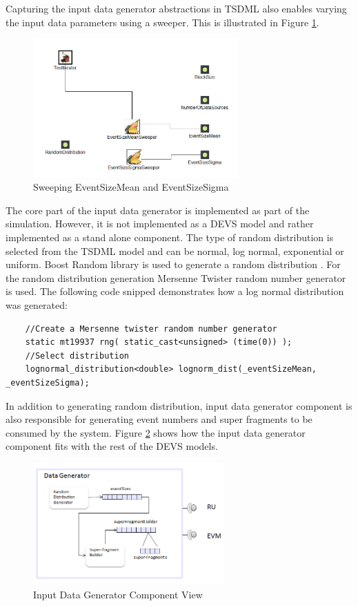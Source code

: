 Capturing the input data generator abstractions in TSDML also enables varying the input data parameters using a sweeper. This is illustrated in Figure \ref{fig:SweepInputGenerator}.

\begin{figure}
	\centering
		\includegraphics[width=0.70\textwidth]{figures/SweepInputGenerator.png}
	\caption{Sweeping EventSizeMean and EventSizeSigma}
	\label{fig:SweepInputGenerator}
\end{figure}

The core part of the input data generator is implemented as part of the simulation. However, it is not implemented as a DEVS model and rather implemented as a stand alone component. The type of random distribution is selected from the TSDML model and can be normal, log normal, exponential or uniform. Boost Random library is used to generate a random distribution \cite{boost}. For the random distribution generation Mersenne Twister random number generator is used. The following code snipped demonstrates how a log normal distribution was generated:

\begin{verbatim}
	//Create a Mersenne twister random number generator
	static mt19937 rng( static_cast<unsigned> (time(0)) );
	//Select distribution
	lognormal_distribution<double> lognorm_dist(_eventSizeMean, _eventSizeSigma);
\end{verbatim}

In addition to generating random distribution, input data generator component is also responsible for generating event numbers and super fragments to be consumed by the system. Figure \ref{fig:DataGenerator} shows how the input data generator component fits with the rest of the DEVS models.

\begin{figure}
	\centering
		\includegraphics[width=0.65\textwidth]{figures/DataGenerator.png}
	\caption{Input Data Generator Component View}
	\label{fig:DataGenerator}
\end{figure}

